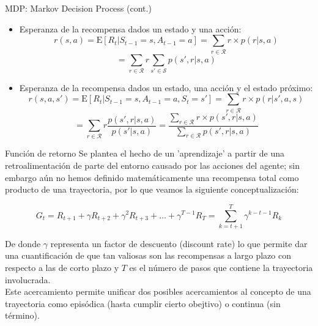 \documentclass[10pt]{beamer}
\begin{document}
        \begin{frame}{MDP: Markov Decision Process (cont.)}
            \begin{itemize}
                \item Esperanza de la recompensa dados un estado y una acción:
                \[
                r(s,a) =\mathrm{E}[R_t | S_{t-1}=s, A_{t-1}=a] = \sum_{r \in \mathcal{R}} r \times p(r|s,a)
                \]
                \[
                = \sum_{r \in \mathcal{R}} r \sum_{s' \in \mathcal{S}} p(s', r | s, a)
                \]
                \item Esperanza de la recompensa dados un estado, una acción y el estado próximo:
                \[
                r(s, a, s') = \mathrm{E}[R_t | S_{t-1} = s, A_{t-1} = a, S_t = s'] = \sum_{r \in \mathcal{R}} r \times p(r | s', a, s)
                \]
                \[
                = \sum_{r \in \mathcal{R}} r \frac{p(s', r | s, a)}{p(s' |s,a)} = \frac{\sum_{r \in \mathcal{R}}r \times p(s',r | s,a)}{\sum_{r \in \mathcal{R}} p(s',r|s,a)}
                \]
            \end{itemize}
        \end{frame}
        
		\begin{frame}{Función de retorno}
			Se plantea el hecho de un 'aprendizaje' a partir de una retroalimentación de parte del entorno causado por las acciones del agente; sin 
			embargo aún no hemos definido matemáticamente una recompensa total como producto de una trayectoria, por lo que veamos la siguiente conceptualización:
			
			\[
			G_t = R_{t+1} + \gamma R_{t+2} + \gamma^2 R_{t+3} + \dots + \gamma^{T-1} R_{T} = \sum_{k=t+1}^T \gamma^{k-t-1}R_k
			\]

			De donde $\gamma$ representa un factor de descuento (discount rate) lo que permite dar una cuantificación de que tan valiosas son las recompensas a 
			largo plazo con respecto a las de corto plazo y $T$ es el número de pasos que contiene la trayectoria involucrada. \\
			Este acercamiento permite unificar dos 
			posibles acercamientos al concepto de una trayectoria como episódica (hasta cumplir cierto obejtivo) o continua (sin término).
		\end{frame}
\end{document}
